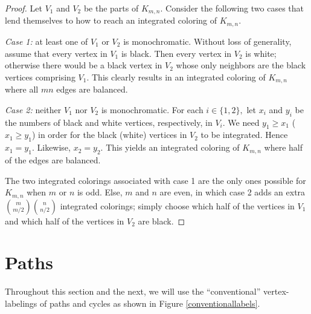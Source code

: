 \documentclass[11pt, reqno]{amsart}
\theoremstyle{definition}
\renewcommand{\geq}{\geqslant}
\begin{document}
\begin{proof}
Let $V_1$ and $V_2$ be the parts of $K_{m,n}.$ Consider the following two cases that lend themselves to how to reach an integrated coloring of $K_{m,n}.$

\textit{Case 1:} at least one of $V_1$ or $V_2$ is monochromatic. Without loss of generality, assume that every vertex in $V_1$ is black. Then every vertex in $V_2$ is white; otherwise there would be a black vertex in $V_2$ whose only neighbors are the black vertices comprising $V_1.$ This clearly results in an integrated coloring of $K_{m,n}$ where all $mn$ edges are balanced.

\textit{Case 2:} neither $V_1$ nor $V_2$ is monochromatic. For each $i \in \{1, 2\},$ let $x_i$ and $y_i$ be the numbers of black and white vertices, respectively, in $V_i.$ We need $y_1 \geq x_1$ ($x_1 \geq y_1$) in order for the black (white) vertices in $V_2$ to be integrated. Hence $x_1 = y_1.$ Likewise, $x_2 = y_2.$ This yields an integrated coloring of $K_{m,n}$ where half of the edges are balanced.

The two integrated colorings associated with case 1 are the only ones possible for $K_{m, n}$ when $m$ or $n$ is odd. Else, $m$ and $n$ are even, in which case 2 adds an extra $\binom{m}{m/2}\binom{n}{n/2}$ integrated colorings; simply choose which half of the vertices in $V_1$ and which half of the vertices in $V_2$ are black.
\end{proof}

\section{Paths}

Throughout this section and the next, we will use the ``conventional'' vertex-labelings of paths and cycles as shown in Figure \ref{conventionallabels}.
\end{document}
